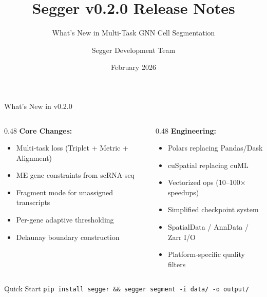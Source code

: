 \documentclass[aspectratio=169,10pt]{beamer}
\title{\textbf{Segger v0.2.0 Release Notes}}
\subtitle{What's New in Multi-Task GNN Cell Segmentation}
\author{Segger Development Team}
\date{February 2026}
\institute{}
\begin{document}
\begin{frame}[plain]
  \maketitle
\end{frame}

\begin{frame}{What's New in v0.2.0}
  \begin{columns}[T]
  \begin{column}{0.48\textwidth}
  \textbf{Core Changes:}
  \begin{itemize}
    \item Multi-task loss (Triplet + Metric + Alignment)
    \item ME gene constraints from scRNA-seq
    \item Fragment mode for unassigned transcripts
    \item Per-gene adaptive thresholding
    \item Delaunay boundary construction
  \end{itemize}
  \end{column}
  \begin{column}{0.48\textwidth}
  \textbf{Engineering:}
  \begin{itemize}
    \item Polars replacing Pandas/Dask
    \item cuSpatial replacing cuML
    \item Vectorized ops (10--100$\times$ speedups)
    \item Simplified checkpoint system
    \item SpatialData / AnnData / Zarr I/O
    \item Platform-specific quality filters
  \end{itemize}
  \end{column}
  \end{columns}

  \vspace{0.4cm}
  \begin{exampleblock}{Quick Start}
  \centering
  \texttt{pip install segger \&\& segger segment -i data/ -o output/}
  \end{exampleblock}
\end{frame}

\end{document}
